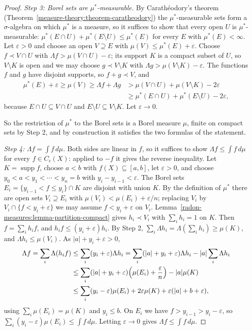 \begin{proof}
\emph{Step 3: Borel sets are $\mu^*$-measurable.} By Carath\'eodory's theorem (Theorem~\ref{measure-theory:theorem-caratheodory}) the $\mu^*$-measurable sets form a $\sigma$-algebra on which $\mu^*$ is a
measure, so it suffices to show that every open $U$ is $\mu^*$-measurable: $\mu^*(E \cap U) + \mu^*(E \setminus U) \leq \mu^*(E)$ for every $E$ with $\mu^*(E) < \infty$. Let $\varepsilon > 0$ and
choose an open $V \supseteq E$ with $\mu(V) \leq \mu^*(E) + \varepsilon$. Choose $f \prec V \cap U$ with $\Lambda f > \mu(V \cap U) - \varepsilon$; its support $K$ is a compact subset of $U$, so
$V \setminus K$ is open and we may choose $g \prec V \setminus K$ with $\Lambda g > \mu(V \setminus K) - \varepsilon$. The functions $f$ and $g$ have disjoint supports, so $f + g \prec V$, and
\[\begin{aligned}
\mu^*(E) + \varepsilon \geq \mu(V) \geq \Lambda f + \Lambda g &> \mu(V \cap U) + \mu(V \setminus K) - 2\varepsilon \\
&\geq \mu^*(E \cap U) + \mu^*(E \setminus U) - 2\varepsilon,
\end{aligned}\]
because $E \cap U \subseteq V \cap U$ and $E \setminus U \subseteq V \setminus K$. Let $\varepsilon \to 0$.

So the restriction of $\mu^*$ to the Borel sets is a Borel measure $\mu$, finite on compact sets by Step 2, and by construction it satisfies the two formulas of the statement.

\emph{Step 4: $\Lambda f = \int f\,d\mu$.} Both sides are linear in $f$, so it suffices to show $\Lambda f \leq \int f\,d\mu$ for every $f \in C_c(X)$: applied to $-f$ it gives the reverse inequality.
Let $K = \operatorname{supp}f$, choose $a < b$ with $f(X) \subseteq [a, b]$, let $\varepsilon > 0$, and choose $y_0 < a < y_1 < \cdots < y_n = b$ with $y_i - y_{i-1} < \varepsilon$. The Borel sets
$E_i = \{y_{i-1} < f \leq y_i\} \cap K$ are disjoint with union $K$. By the definition of $\mu^*$ there are open sets $V_i \supseteq E_i$ with $\mu(V_i) < \mu(E_i) + \varepsilon/n$; replacing $V_i$ by
$V_i \cap \{f < y_i + \varepsilon\}$ we may assume $f < y_i + \varepsilon$ on $V_i$. Lemma~\ref{radon-measures:lemma-partition-compact} gives $h_i \prec V_i$ with $\sum_ih_i = 1$ on $K$. Then
$f = \sum_ih_if$, and $h_if \leq (y_i + \varepsilon)h_i$. By Step 2, $\sum_i\Lambda h_i = \Lambda(\sum_ih_i) \geq \mu(K)$, and $\Lambda h_i \leq \mu(V_i)$. As $|a| + y_i + \varepsilon > 0$,
\[
\begin{aligned}
\Lambda f = \sum_i\Lambda(h_if) &\leq \sum_i(y_i + \varepsilon)\Lambda h_i = \sum_i(|a| + y_i + \varepsilon)\Lambda h_i - |a|\sum_i\Lambda h_i\\
&\leq \sum_i(|a| + y_i + \varepsilon)\Bigl(\mu(E_i) + \frac{\varepsilon}{n}\Bigr) - |a|\mu(K)\\
&\leq \sum_i(y_i - \varepsilon)\mu(E_i) + 2\varepsilon\mu(K) + \varepsilon(|a| + b + \varepsilon),
\end{aligned}
\]
using $\sum_i\mu(E_i) = \mu(K)$ and $y_i \leq b$. On $E_i$ we have $f > y_{i-1} > y_i - \varepsilon$, so $\sum_i(y_i - \varepsilon)\mu(E_i) \leq \int f\,d\mu$. Letting $\varepsilon \to 0$ gives
$\Lambda f \leq \int f\,d\mu$.


\end{proof}
